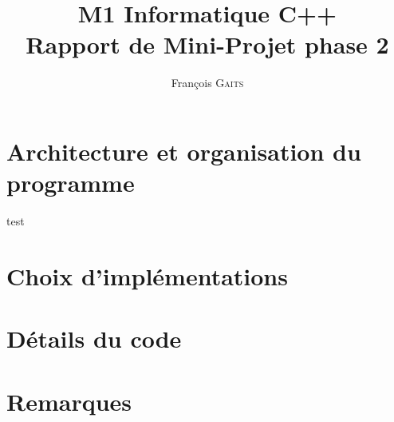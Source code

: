 \documentclass[]{article}
\author{François G\textsc{aits}}
\title{M1 Informatique C++\\Rapport de Mini-Projet phase 2}
\begin{document}
\maketitle

\section{Architecture et organisation du programme}
test

\section{Choix d'implémentations}


\section{Détails du code}


\section{Remarques}
\end{document}

